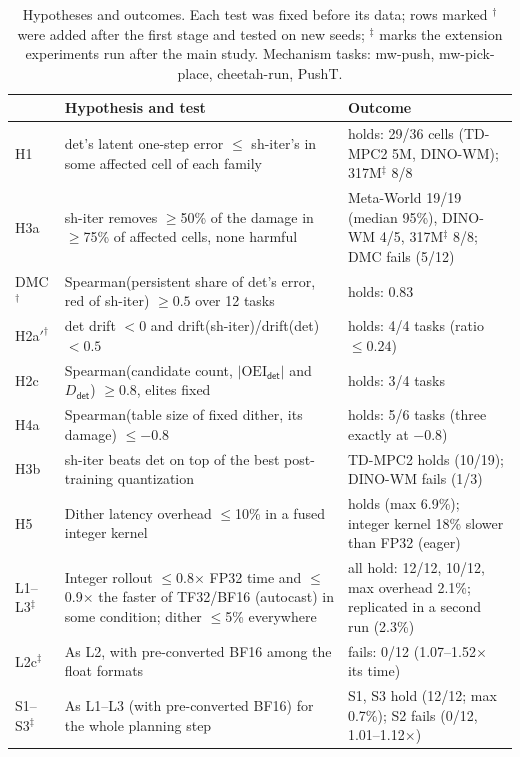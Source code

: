 \documentclass[conference]{IEEEtran}
\newcommand{\dtm}{\textsf{det}\xspace}
\newcommand{\shiter}{\textsf{sh-iter}\xspace}
\newcommand{\extrun}{run after the main study}
\newcommand{\extrun}{run for this submission}
\begin{document}
\begin{table}[t]
\centering
\footnotesize
\setlength{\tabcolsep}{4pt}
\caption{Hypotheses and outcomes. Each test was fixed before its data; rows marked $^\dagger$ were added after the first stage and tested on new seeds; $^\ddagger$ marks the extension experiments \extrun. Mechanism tasks: mw-push, mw-pick-place, cheetah-run, PushT.}
\label{tab:hyp}
\begin{tabular}{@{}l>{\raggedright\arraybackslash}p{}>{\raggedright\arraybackslash}p{}@{}}
\toprule
& Hypothesis and test & Outcome \\
\midrule
H1 & \dtm's latent one-step error $\le$ \shiter's in some affected cell of each family & holds: 29/36 cells (TD-MPC2 5M, DINO-WM); 317M$^\ddagger$ 8/8 \\
H3a & \shiter removes $\ge$50\% of the damage in $\ge$75\% of affected cells, none harmful & Meta-World 19/19 (median 95\%), DINO-WM 4/5, 317M$^\ddagger$ 8/8; DMC fails (5/12) \\
DMC$^\dagger$ & Spearman(persistent share of \dtm's error, red of \shiter) $\ge 0.5$ over 12 tasks & holds: 0.83 \\
H2a$'^\dagger$ & \dtm drift $<0$ and drift(\shiter)/drift(\dtm) $<0.5$ & holds: 4/4 tasks (ratio $\le 0.24$) \\
H2c & Spearman(candidate count, $|\mathrm{OEI}_{\dtm}|$ and $D_{\dtm}$) $\ge 0.8$, elites fixed & holds: 3/4 tasks \\
H4a & Spearman(table size of fixed dither, its damage) $\le -0.8$ & holds: 5/6 tasks (three exactly at $-0.8$) \\
H3b & \shiter beats \dtm on top of the best post-training quantization & TD-MPC2 holds (10/19); DINO-WM fails (1/3) \\
H5 & Dither latency overhead $\le$10\% in a fused integer kernel & holds (max 6.9\%); integer kernel 18\% slower than FP32 (eager) \\
L1--L3$^\ddagger$ & Integer rollout $\le$0.8$\times$ FP32 time and $\le$0.9$\times$ the faster of TF32/BF16 (autocast) in some condition; dither $\le$5\% everywhere & all hold: 12/12, 10/12, max overhead 2.1\%; replicated in a second run (2.3\%) \\
L2c$^\ddagger$ & As L2, with pre-converted BF16 among the float formats & fails: 0/12 (1.07--1.52$\times$ its time) \\
S1--S3$^\ddagger$ & As L1--L3 (with pre-converted BF16) for the whole planning step & S1, S3 hold (12/12; max 0.7\%); S2 fails (0/12, 1.01--1.12$\times$) \\

\end{tabular}
\end{table}
\end{document}
